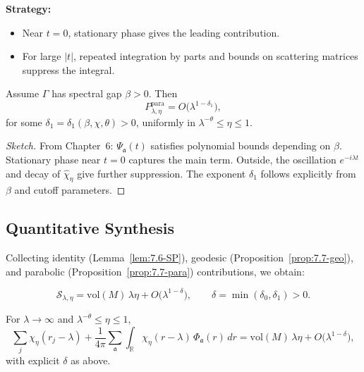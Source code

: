 \noindent\textbf{Strategy:}
\begin{itemize}
  \item Near $t=0$, stationary phase gives the leading contribution.
  \item For large $|t|$, repeated integration by parts and bounds on scattering matrices suppress the integral.
\end{itemize}

\begin{proposition}\label{prop:7.7-para}
Assume $\Gamma$ has spectral gap $\beta>0$.  
Then
\[
  P_{\lambda,\eta}^{\mathrm{para}}
  = O\!\big(\lambda^{1-\delta_1}\big),
\]
for some $\delta_1=\delta_1(\beta,\chi,\theta)>0$,
uniformly in $\lambda^{-\theta}\le \eta\le 1$.
\end{proposition}

\begin{proof}[Sketch]
From Chapter~6:  
$\Psi_{\mathfrak{a}}(t)$ satisfies polynomial bounds depending on $\beta$.  
Stationary phase near $t=0$ captures the main term.  
Outside, the oscillation $e^{-i\lambda t}$ and decay of $\widehat{\chi}_\eta$ give further suppression.  
The exponent $\delta_1$ follows explicitly from $\beta$ and cutoff parameters.
\end{proof}

\subsection{Quantitative Synthesis}

Collecting identity (Lemma~\ref{lem:7.6-SP}), geodesic (Proposition~\ref{prop:7.7-geo}), and parabolic (Proposition~\ref{prop:7.7-para}) contributions, we obtain:

\begin{equation}\label{eq:7.7-quant}
  \mathcal{S}_{\lambda,\eta}
  = \mathrm{vol}(M)\,\lambda\eta
    + O\!\big(\lambda^{1-\delta}\big),
  \qquad \delta=\min(\delta_0,\delta_1)>0.
\end{equation}

\begin{proposition}\label{prop:7.7-synthesis}
For $\lambda\to\infty$ and $\lambda^{-\theta}\le \eta\le 1$,
\[
  \sum_j \chi_\eta(r_j-\lambda)
  + \frac{1}{4\pi}\sum_{\mathfrak{a}}\int_{\mathbb{R}}
       \chi_\eta(r-\lambda)\,\Phi_{\mathfrak{a}}(r)\, dr
  = \mathrm{vol}(M)\,\lambda\eta
    + O\!\big(\lambda^{1-\delta}\big),
\]
with explicit $\delta$ as above.
\end{proposition}


